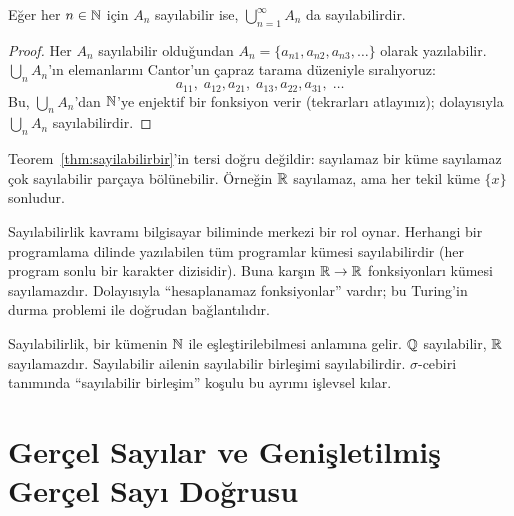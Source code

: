\begin{teorem}\label{thm:sayilabilirbir}
Eğer her $n \in \mathbb{N}$ için $A_n$ sayılabilir ise,
$\bigcup_{n=1}^\infty A_n$ da sayılabilirdir.
\end{teorem}

\begin{proof}
Her $A_n$ sayılabilir olduğundan $A_n = \{a_{n1}, a_{n2}, a_{n3}, \ldots\}$
olarak yazılabilir. $\bigcup_n A_n$'ın elemanlarını Cantor'un çapraz tarama
düzeniyle sıralıyoruz:
\[
  a_{11},\; a_{12}, a_{21},\; a_{13}, a_{22}, a_{31},\; \ldots
\]
Bu, $\bigcup_n A_n$'dan $\mathbb{N}$'ye enjektif bir fonksiyon verir (tekrarları atlayınız);
dolayısıyla $\bigcup_n A_n$ sayılabilirdir.
\end{proof}

\begin{notkutu}
Teorem~\ref{thm:sayilabilirbir}'in tersi doğru değildir: sayılamaz bir küme
sayılamaz çok sayılabilir parçaya bölünebilir. Örneğin $\mathbb{R}$ sayılamaz,
ama her tekil küme $\{x\}$ sonludur.
\end{notkutu}

\begin{disiplinlerarasibaglan}
Sayılabilirlik kavramı bilgisayar biliminde merkezi bir rol oynar.
Herhangi bir programlama dilinde yazılabilen tüm programlar kümesi sayılabilirdir
(her program sonlu bir karakter dizisidir). Buna karşın $\mathbb{R} \to \mathbb{R}$
fonksiyonları kümesi sayılamazdır. Dolayısıyla ``hesaplanamaz fonksiyonlar'' vardır;
bu Turing'in durma problemi ile doğrudan bağlantılıdır.
\end{disiplinlerarasibaglan}

\begin{mikroozet}[§0.3 özeti]
Sayılabilirlik, bir kümenin $\mathbb{N}$ ile eşleştirilebilmesi anlamına gelir.
$\mathbb{Q}$ sayılabilir, $\mathbb{R}$ sayılamazdır. Sayılabilir ailenin sayılabilir
birleşimi sayılabilirdir. $\sigma$-cebiri tanımında ``sayılabilir birleşim'' koşulu
bu ayrımı işlevsel kılar.
\end{mikroozet}


\section{Gerçel Sayılar ve Genişletilmiş Gerçel Sayı Doğrusu}

